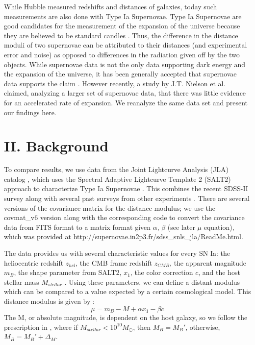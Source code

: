 \documentclass[aps,prl,reprint]{revtex4-1}
\begin{document}
While Hubble measured redshifts and distances of galaxies, today such measurements are also done with Type Ia Supernovae. Type Ia Supernovae are good candidates for the measurement of the expansion of the universe because they are believed to be standard candles \cite{shocker}. Thus, the difference in the distance moduli of two supernovae can be attributed to their distances (and experimental error and noise) as opposed to differences in the radiation given off by the two objects. While supernovae data is not the only data supporting dark energy and the expansion of the universe, it has been generally accepted that supernovae data supports the claim \cite{riess_sn,sdss}. However recently, a study by J.T. Nielson et al. \cite{shocker} claimed, analyzing a larger set of supernovae data, that there was little evidence for an accelerated rate of expansion. We reanalyze the same data set and present our findings here.
\section{II. Background}
To compare results, we use data from the Joint Lightcurve Analysis (JLA) catalog \cite{sdss}, which uses the Spectral Adaptive Lightcurve Template 2 (SALT2) approach to characterize Type Ia Supernovae \cite{salt2}. This combines the recent SDSS-II survey along with several past surveys from other experiments \cite{sdss}. There are several versions of the covariance matrix for the distance modulus; we use the covmat\_v6 version along with the corresponding code to convert the covariance data from FITS format \cite{fits} to a matrix format given $\alpha$, $\beta$ (see later $\mu$ equation), which was provided at http://supernovae.in2p3.fr/sdss\_snls\_jla/ReadMe.html. 
\par The data provides us with several characteristic values for every SN Ia: the heliocentric redshift $z_{hel}$, the CMB frame redshift $z_{CMB}$, the apparent magnitude $m_B$, the shape parameter from SALT2, $x_1$, the color correction $c$, and the host stellar mass $M_{stellar}$ \cite{sdss}. Using these parameters, we can define a distant modulus which can be compared to a value expected by a certain cosmological model. This distance modulus is given by \cite{sdss}: 
\begin{equation}
\mu = m_B - M + \alpha x_1 - \beta c
\end{equation}
The M, or absolute magnitude, is dependent on the host galaxy, so we follow the prescription in \cite{sdss}, where if $M_{stellar} < 10^{10} M_{\odot}$, then $M_B = M_B'$, otherwise, $M_B = M_B' + \Delta_M$. 
\end{document}

